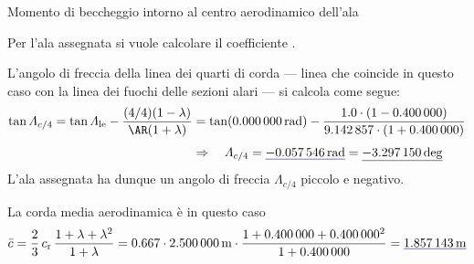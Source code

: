 \documentclass[[12pt,twoside]{book}
\begin{document}
\begin{myExampleX}{Momento di beccheggio intorno al centro aerodinamico dell'ala}{}
\smallskip
\noindent
{}

\smallskip
\noindent
{}

\smallskip
\noindent
{}

\smallskip
Per l'ala assegnata si vuole calcolare il coefficiente .

\medskip
L'angolo di freccia della linea dei quarti di corda --- linea che coincide in questo caso con la linea dei
fuochi delle sezioni alari --- si calcola come segue:
\[
\begin{split}
\tan
\Lambda_{c/4}
   = \tan\Lambda_\mathrm{le}-\dfrac{(4/4)(1-\lambda)}{\AR(1+\lambda)}
   & {}=
    \tan (\SI[round-precision=0]{\mySweepLEWingRAD}{\radian})
      - \dfrac{
         \num[round-precision=2]{1.0}
         \cdot (1-\SI[round-precision=2]{\myTaperRatioWing}{})
      }{
         \num[round-precision=2]{\myAspectRatioWing}
         \cdot (1+\SI[round-precision=2]{\myTaperRatioWing}{})} 
\\[3pt]
   & \Rightarrow
   \quad
   \Lambda_{c/4}
      = \mathunderline{mydarkblue}{ \SI[round-precision=4]{\mySweepQuarterChordWingRAD}{\radian} }
      = \mathunderline{mydarkblue}{ \SI[round-precision=1]{\mySweepQuarterChordWingDEG}{\deg} }
\end{split}
\]
L'ala assegnata ha dunque un angolo di freccia $\Lambda_{c/4}$ piccolo e negativo.

La corda media aerodinamica è in questo caso
\[
\bar{c} = \frac{2}{3} \, c_\mathrm{r} \, \frac{1+\lambda + \lambda^2}{1+\lambda}
  =
    \num{0.667} \cdot \SI[round-precision=2]{\myChordRootWingMT}{\metre}
      \cdot 
        \frac{
          1 + \SI[round-precision=2]{\myTaperRatioWing}{} + \SI[round-precision=2]{\myTaperRatioWing}{}^2
        }{
          1 + \SI[round-precision=2]{\myTaperRatioWing}{}
        }
    = \mathunderline{mydarkblue}{ \SI[round-precision=2]{\myMACWingMT}{\metre} }
\]


\end{myExampleX}
\end{document}
